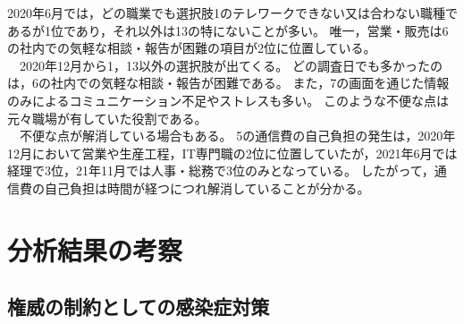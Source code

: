 \documentclass[paper={210mm,297mm},line_length=35zw,number_of_lines=31,head_space=30mm,gutter=40mm,baselineskip=2.0zw,headfoot_verticalposition=1.5zw]{jlreq} %
\begin{document}
2020年6月では，どの職業でも選択肢1のテレワークできない又は合わない職種であるが1位であり，それ以外は13の特にないことが多い。
唯一，営業・販売は6の社内での気軽な相談・報告が困難の項目が2位に位置している。\\
　2020年12月から1，13以外の選択肢が出てくる。
どの調査日でも多かったのは，6の社内での気軽な相談・報告が困難である。
また，7の画面を通じた情報のみによるコミュニケーション不足やストレスも多い。
このような不便な点は元々職場が有していた役割である。\\
　不便な点が解消している場合もある。
5の通信費の自己負担の発生は，2020年12月において営業や生産工程，IT専門職の2位に位置していたが，2021年6月では経理で3位，21年11月では人事・総務で3位のみとなっている。
したがって，通信費の自己負担は時間が経つにつれ解消していることが分かる。\\

\section{分析結果の考察}

\subsection{権威の制約としての感染症対策}
\end{document}
